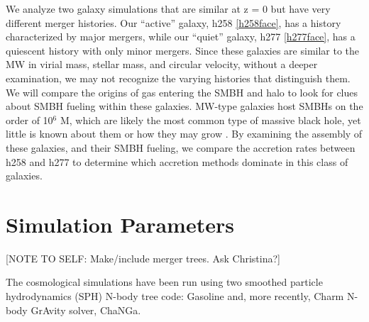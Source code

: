 \documentclass[manuscript]{aastex}
\begin{document}
We analyze two galaxy simulations that are similar at z = 0 but have very different merger histories. Our ``active'' galaxy, h258 \ref{h258face}, has a history characterized by major mergers, while our ``quiet'' galaxy, h277 \ref{h277face}, has a quiescent history with only minor mergers. Since these galaxies are similar to the MW in virial mass, stellar mass, and circular velocity, without a deeper examination, we may not recognize the varying histories that distinguish them. We will compare the origins of gas entering the SMBH and halo to look for clues about SMBH fueling within these galaxies. %
MW-type galaxies host SMBHs on the order of 10$^6$ M, which are likely the most common type of massive black hole, yet little is known about them or how they may grow \citep{Kormendy2013}.  By examining the assembly of these galaxies, and their SMBH fueling, we compare the accretion rates between h258 and h277 to determine which accretion methods dominate in this class of galaxies.

  

\section{Simulation Parameters}\label{sec-model}

[NOTE TO SELF: Make/include merger trees. Ask Christina?]

The cosmological simulations have been run using two smoothed particle hydrodynamics (SPH) N-body tree code: Gasoline \citep[][Stadel 2001, how do I cite a PhD thesis?]{Wadsley2004} and, more recently, Charm N-body GrAvity solver, ChaNGa. 
\end{document}
